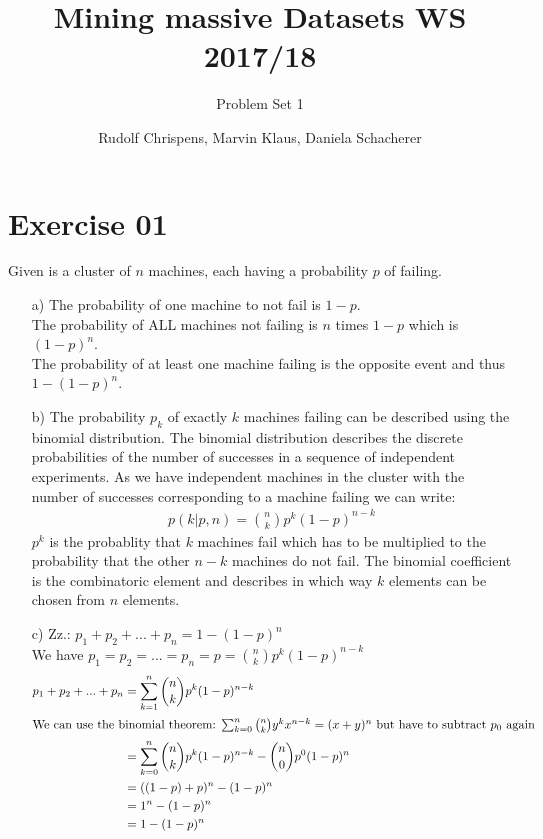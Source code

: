 \documentclass[11pt,a4paper]{scrartcl}
\title{Mining massive Datasets WS 2017/18}
\subtitle{Problem Set 1}
\author{Rudolf Chrispens, Marvin Klaus, Daniela Schacherer}
\begin{document}
\maketitle

	\section*{Exercise 01}
	Given is a cluster of $n$ machines, each having a probability $p$ of failing. 
	\begin{itemize}
		\item[a)] The probability of one machine to not fail is $1-p$. \\
		The probability of ALL machines not failing is $n$ times $1-p$ which is $(1-p)^n$. \\
		The probability of at least one machine failing is the opposite event and thus $1 - (1-p)^n$.
		\item[b)] The probability $p_k$ of exactly $k$ machines failing can be described using the binomial distribution. The binomial distribution describes the discrete probabilities of the number of successes in a sequence of independent experiments. As we have independent machines in the cluster with the number of successes corresponding to a machine failing we can write: \\
		\begin{align*}
			p(k|p,n) = {n\choose k} p^k (1-p)^{n-k}
		\end{align*}
		$p^k$ is the probablity that $k$ machines fail which has to be multiplied to the probability that the other $n-k$ machines do not fail. The binomial coefficient is the combinatoric element and describes in which way $k$ elements can be chosen from $n$ elements. 
		\item[c)] 
		Zz.: $p_1 + p_2 + ... + p_n = 1 - (1-p)^n$ \\
		We have $p_1 = p_2 = ... = p_n = p = {n \choose k} p^k (1-p)^{n-k}$
		\begin{align*}
			p_1 + p_2 + ... + p_n &= \sum_{k=1}^n {n \choose k} p^k (1-p)^{n-k} \\
			\intertext{We can use the binomial theorem: $\sum_{k=0}^n {n\choose k} y^k x^{n-k} = (x+y)^n$ but have to subtract $p_0$ again}
			&=  \sum_{k=0}^n {n \choose k} p^k (1-p)^{n-k} - {n \choose 0} p^0 (1-p)^n \\
			&= ((1-p) + p)^n - (1-p)^n	\\		
			&= 1^n - (1-p)^ n \\
			&= 1-(1-p)^n			
		\end{align*}
	\end{itemize}
	
\end{document}
